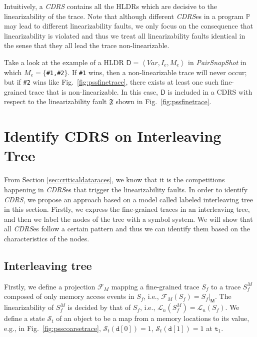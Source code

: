 \documentclass[runningheads]{llncs}
\newcommand{\se}{\mathit{I_e}}
\newcommand{\ce}{\mathit{M_e}}
\begin{document}
Intuitively, a \textit{CDRS} contains all the HLDRs which are decisive to the linearizability of the trace. Note that although different \textit{CDRS}es in a program $\mathbb{P}$ may lead to different linearizability faults, we only focus on the consequence
that linearizability is violated and thus we treat all linearizability faults identical in the sense that they all lead the trace non-linearizable.

\begin{example} 

Take a look at the example of a HLDR $\mathsf{D}  = \left\langle \mathit{Var}, \se, \ce\right\rangle$  in \textit{PairSnapShot} in which $\ce = \{$\texttt{\#1,\#2}$\}$. If \texttt{\#1} wins, then a non-linearizable trace will never occur; but if \texttt{\#2} wins like Fig.~\ref{fig:pssfinetrace}, there exists at least one such fine-grained trace that is non-linearizable. In this case,  $\mathsf{D}$ is included in a CDRS with respect to the linearizability fault $\mathfrak{F}$ shown in Fig.~\ref{fig:pssfinetrace}.

\end{example}



\section{Identify CDRS on Interleaving Tree}\label{sec:intertree}
From Section \ref{sec:criticaldataraces}, we know that it is the competitions happening in \textit{CDRS}es that trigger the linearizability faults. In order to identify \textit{CDRS}, we propose an approach based on a model called labeled interleaving tree in this section. Firstly, we express the fine-grained traces in an interleaving tree, and then we label the nodes of the tree with a symbol system. We will show that all \textit{CDRS}es follow a certain pattern and thus we can identify them based on the characteristics of the nodes. 
\subsection{Interleaving tree}

Firstly, we define a projection $\mathcal{F}_M$ mapping a fine-grained trace $S_f$ to a trace $S^M_f$ composed of only memory access events in $S_f$, i.e., $\mathcal{F}_M(S_f) = S_f|_{\mathsf{M}}$. The linearizability of $S^M_f$ is decided by that of $S_f$, i.e., $\mathcal{L}_n(S^M_f)  = \mathcal{L}_n(S_f)$. We define a state $\mathcal{S}_t$ of an object to be a map from a memory locations to its value, e.g., in 
Fig.~\ref{fig:psscoarsetrace}, $\mathcal{S}_t(\mathtt{d}[0]) = 1$, $\mathcal{S}_t(\mathtt{d}[1]) = 1$ at $\mathtt{t}_1$.
\end{document}

